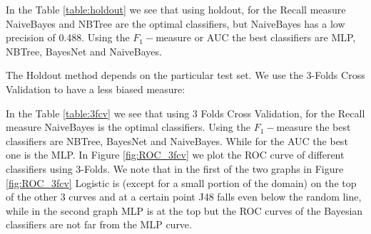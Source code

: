 \documentclass[fleqn,10pt]{SelfArx} %
\begin{document}
\noindent
In the Table \ref{table:holdout} we see that using holdout, for the Recall measure NaiveBayes and NBTree are the optimal classifiers, but NaiveBayes has a low precision of 0.488. Using the $F_1-$measure or AUC the best classifiers are MLP, NBTree, BayesNet and NaiveBayes.\newline

The Holdout method depends on the particular test set. We use the 3-Folds Cross Validation to have a less biased measure:

\begin{table}[h]
	\caption{Evaluation measures using 3-Folds Cross Validation}
	\label{table:3fcv}
\end{table}

\noindent
In the Table \ref{table:3fcv} we see that using 3 Folds Cross Validation, for the Recall measure NaiveBayes is the optimal classifiers. Using the $F_1-$measure the best classifiers are NBTree, BayesNet and NaiveBayes. While for the AUC the best one is the MLP.
In Figure \ref{fig:ROC_3fcv} we plot the ROC curve of different classifiers using 3-Folds. We note that in the first of the two graphs in Figure \ref{fig:ROC_3fcv} Logistic is (except for a small portion of the domain) on the top of the other 3 curves and at a certain point J48 falls even below the random line, while in the second graph MLP is at the top but the ROC curves of the Bayesian classifiers are not far from the MLP curve.
\end{document}
